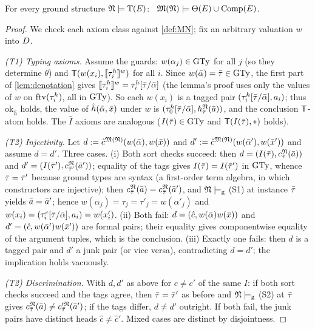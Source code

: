 \begin{theorem}
  \label{thm:base-soundness}
  For every ground structure $\mathfrak{N} \models \mathbb{T}(E)$:
  \ $\mathfrak{M}(\mathfrak{N}) \models \Theta(E) \cup \mathrm{Comp}(E)$.
\end{theorem}

\begin{proof}
  We check each axiom class against \cref{def:MN}; fix an arbitrary
  valuation $w$ into $D$.

  \emph{(T1) Typing axioms.}  Assume the guards: $w(\alpha_j) \in \mathrm{GTy}$
  for all $j$ (so they determine $\theta$) and
  $\mathsf{T}(w(x_i), [\![ \tau^h_i ]\!]^{w})$ for all $i$.  Since
  $w(\bar{\alpha}) = \bar{\tau} \in \mathrm{GTy}$, the first part of
  \cref{lem:denotation} gives
  $[\![ \tau^h_i ]\!]^{w} = \tau^h_i[\bar{\tau}/\bar{\alpha}]$ (the lemma's
  proof uses only the values of $w$ on $\mathrm{ftv}(\tau^h_i)$, all in $\mathrm{GTy}$).
  So each $w(x_i)$ is a tagged pair
  $(\tau^h_i[\bar{\tau}/\bar{\alpha}], a_i)$; thus $\mathrm{ok}_{\hat h}$
  holds, the value of $\hat h(\bar{\alpha}, \bar{x})$ under $w$ is
  $(\tau^h_0[\bar{\tau}/\bar{\alpha}], h^{\mathfrak{N}}_{\bar{\tau}}(\bar{a}))$, and the
  conclusion $\mathsf{T}$-atom holds.  The $\hat I$ axioms are analogous
  ($I(\bar{\tau}) \in \mathrm{GTy}$ and $\mathsf{T}(I(\bar{\tau}), \ast)$ holds).

  \emph{(T2) Injectivity.}  Let
  $d \mathrel{:=} \hat c^{\mathfrak{M}(\mathfrak{N})}(w(\bar{\alpha}), w(\bar{x}))$ and
  $d' \mathrel{:=} \hat c^{\mathfrak{M}(\mathfrak{N})}(w(\bar{\alpha}'), w(\bar{x}'))$ and assume $d = d'$.
  Three cases.  (i) Both sort checks succeed: then
  $d = (I(\bar{\tau}), c^{\mathfrak{N}}_{\bar{\tau}}(\bar{a}))$ and
  $d' = (I(\bar{\tau}'), c^{\mathfrak{N}}_{\bar{\tau}'}(\bar{a}'))$; equality of the
  tags gives $I(\bar{\tau}) = I(\bar{\tau}')$ in $\mathrm{GTy}$, whence
  $\bar{\tau} = \bar{\tau}'$ because ground types are syntax (a first-order
  term algebra, in which constructors are injective); then
  $c^{\mathfrak{N}}_{\bar{\tau}}(\bar{a}) = c^{\mathfrak{N}}_{\bar{\tau}}(\bar{a}')$, and
  $\mathfrak{N} \models_{\mathrm{g}}$ (S1) at instance $\bar{\tau}$ yields $\bar{a} = \bar{a}'$; hence
  $w(\alpha_j) = \tau_j = \tau'_j = w(\alpha'_j)$ and
  $w(x_i) = (\tau^c_i[\bar{\tau}/\bar{\alpha}], a_i) = w(x'_i)$.  (ii) Both
  fail: $d = (\hat c, w(\bar{\alpha})w(\bar{x}))$ and
  $d' = (\hat c, w(\bar{\alpha}')w(\bar{x}'))$ are formal pairs; their
  equality gives componentwise equality of the argument tuples, which is
  the conclusion.  (iii) Exactly one fails: then $d$ is a tagged pair and
  $d'$ a junk pair (or vice versa), contradicting $d = d'$; the
  implication holds vacuously.

  \emph{(T2) Discrimination.}  With $d, d'$ as above for $c \neq c'$ of
  the same $I$: if both sort checks succeed and the tags agree, then
  $\bar{\tau} = \bar{\tau}'$ as before and
  $\mathfrak{N} \models_{\mathrm{g}}$ (S2) at $\bar{\tau}$ gives
  $c^{\mathfrak{N}}_{\bar{\tau}}(\bar{a}) \neq c'^{\mathfrak{N}}_{\bar{\tau}}(\bar{a}')$; if the
  tags differ, $d \neq d'$ outright.  If both fail, the junk pairs have
  distinct heads $\hat c \neq \hat c'$.  Mixed cases are distinct by
  disjointness.


\end{proof}
